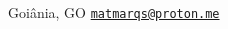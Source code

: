 \documentclass[a4paper]{article}
\makeatletter
\newcommand{\myemail}{\href{mailto:matmarqs@proton.me}{\texttt{matmarqs@proton.me}}}
\newcommand{\mycity}{Goiânia, GO}
\makeatother
\begin{document}
\begin{paracol}{2}
\vspace{2em}

\newlength{\rightcolwidth}
\setlength{\rightcolwidth}{0.75\textwidth}
\begin{minipage}[t]{\rightcolwidth}
\begin{center}\fontfamily{\sfdefault}\selectfont \color{black!70}
{\small
 \mycity \;\;
 \myemail
}
\end{center}
\end{minipage}



\end{paracol}
\end{document}
